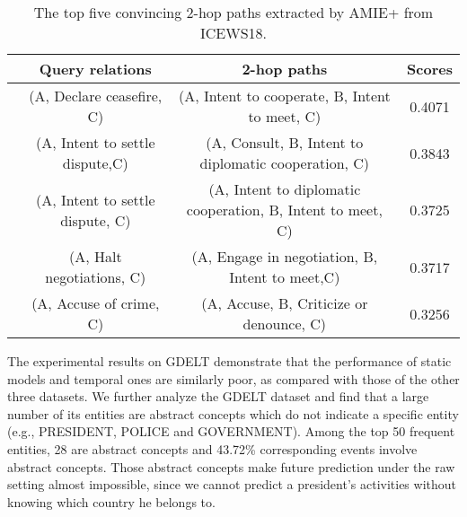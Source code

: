\documentclass[11pt,a4paper]{article}
\begin{document}
\begin{table*}
  \small
  \centering
  \begin{tabular}{cccc}
  \toprule
  &Query relations & 2-hop paths  &Scores \\
  \midrule
    & (A, Declare ceasefire, C) &(A, Intent to cooperate, B, Intent to meet, C)
    &0.4071\\
    & (A, Intent to settle dispute,C) & (A, Consult, B, Intent to diplomatic
    cooperation, C) &0.3843 \\
    & (A, Intent to settle dispute, C) &(A, Intent to diplomatic cooperation, B,
  Intent to meet, C) &0.3725 \\
    &(A, Halt negotiations, C) & (A, Engage in negotiation, B, Intent to meet,C)
    &0.3717 \\
    & (A, Accuse of crime, C) &(A, Accuse, B, Criticize or denounce, C)  &0.3256
    \\
  \bottomrule
  \end{tabular}
  \vspace{-2mm}
  \caption{The top five convincing 2-hop paths extracted by AMIE+ from ICEWS18.}
  \label{table:clue_AMIE}
  \vspace{-2mm}
  \end{table*}

The experimental results on GDELT demonstrate that the performance of static
models and temporal ones are similarly poor, as compared with those of the other
three datasets. We further analyze the GDELT dataset and find that a large
number of its entities are abstract concepts which do not indicate a specific
entity (e.g., PRESIDENT, POLICE and GOVERNMENT). Among the top 50 frequent
entities, 28 are abstract concepts and 43.72\% corresponding events involve
abstract concepts. Those abstract concepts make future prediction under the raw
setting almost impossible, since we cannot predict a president's activities
without knowing which country he belongs to. 
\end{document}
